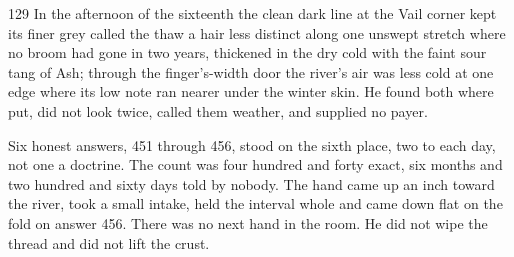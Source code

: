\begin{CRchronicle}{129}
In the afternoon of the sixteenth the clean dark line at the Vail corner kept its finer grey called the thaw a hair less distinct along one unswept stretch where no broom had gone in two years, thickened in the dry cold with the faint sour tang of Ash; through the finger’s-width door the river’s air was less cold at one edge where its low note ran nearer under the winter skin. He found both where put, did not look twice, called them weather, and supplied no payer.

Six honest answers, 451 through 456, stood on the sixth place, two to each day, not one a doctrine. The count was four hundred and forty exact, six months and two hundred and sixty days told by nobody. The hand came up an inch toward the river, took a small intake, held the interval whole and came down flat on the fold on answer 456. There was no next hand in the room. He did not wipe the thread and did not lift the crust.
\end{CRchronicle}
